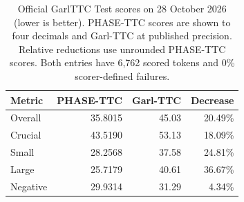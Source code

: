 \begin{table}[H]
\centering\small
\caption{Official GarlTTC Test scores on 28 October 2026 (lower is better). PHASE-TTC scores are shown to four decimals and Garl-TTC at published precision. Relative reductions use unrounded PHASE-TTC scores. Both entries have 6,762 scored tokens and 0\% scorer-defined failures. }
\label{tab:official-benchmark}
\begin{tabular}{lrrr}
\toprule
\textbf{Metric} & \textbf{PHASE-TTC} & \textbf{Garl-TTC} & \textbf{Decrease} \\
\midrule
Overall & 35.8015 & 45.03 & 20.49\% \\
Crucial & 43.5190 & 53.13 & 18.09\% \\
Small & 28.2568 & 37.58 & 24.81\% \\
Large & 25.7179 & 40.61 & 36.67\% \\
Negative & 29.9314 & 31.29 & 4.34\% \\
\bottomrule
\end{tabular}
\end{table}
